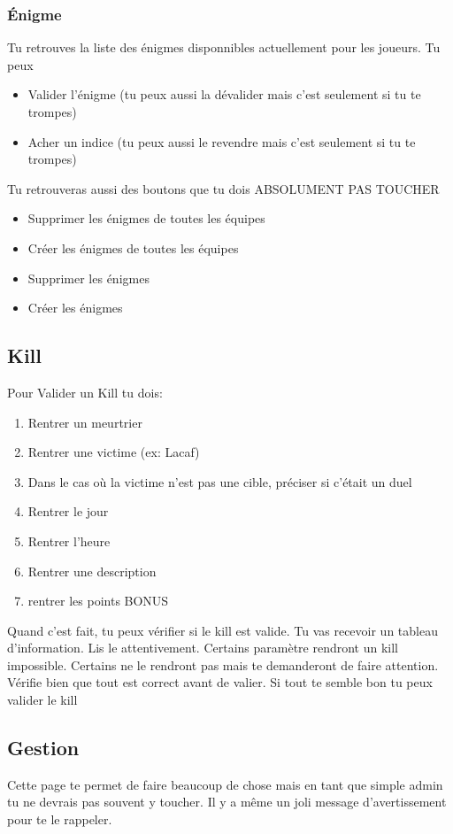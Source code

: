\documentclass[12pt]{article}
\begin{document}
\subsubsection{Énigme}
Tu retrouves la liste des énigmes disponnibles actuellement pour les joueurs. Tu peux
\begin{itemize}
  \item Valider l'énigme (tu peux aussi la dévalider mais c'est seulement si tu te trompes)
  \item Acher un indice (tu peux aussi le revendre mais c'est seulement si tu te trompes)
\end{itemize}
Tu retrouveras aussi des boutons que tu dois ABSOLUMENT PAS TOUCHER
\begin{itemize}
  \item Supprimer les énigmes de toutes les équipes
  \item Créer les énigmes de toutes les équipes
  \item Supprimer les énigmes
  \item Créer les énigmes
\end{itemize}

\subsection{Kill}
Pour Valider un Kill tu dois:
\begin{enumerate}
  \item Rentrer un meurtrier
  \item Rentrer une victime (ex: Lacaf)
  \item Dans le cas où la victime n'est pas une cible, préciser si c'était un duel
  \item Rentrer le jour
  \item Rentrer l'heure
  \item Rentrer une description
  \item rentrer les points BONUS
\end{enumerate}

Quand c'est fait, tu peux vérifier si le kill est valide. Tu vas recevoir un tableau d'information. Lis le attentivement. Certains paramètre rendront un kill impossible. Certains ne le rendront pas mais te demanderont de faire attention. Vérifie bien que tout est correct avant de valier. Si tout te semble bon tu peux valider le kill

\subsection{Gestion}
Cette page te permet de faire beaucoup de chose mais en tant que simple admin tu ne devrais pas souvent y toucher. Il y a même un joli message d'avertissement pour te le rappeler.
\end{document}
